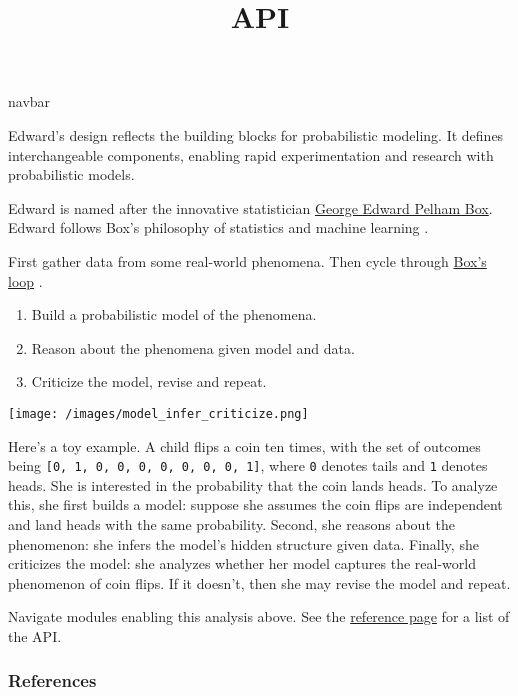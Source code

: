 \title{API}

{{navbar}}

Edward's design reflects the building blocks for probabilistic
modeling. It defines interchangeable components, enabling rapid
experimentation and research with probabilistic models.

Edward is named after the innovative statistician
\href{https://en.wikipedia.org/wiki/George_E._P._Box}{George Edward
Pelham Box}. Edward follows Box's philosophy of statistics and machine
learning \citep{box1976science}.

First gather data from some real-world phenomena. Then cycle through
\href{http://www.annualreviews.org/eprint/7xbyci3nwAg5kEttvvjk/full/10.1146/annurev-statistics-022513-115657}
{Box's loop} \citep{blei2014build}.

\begin{enumerate}
\item Build a probabilistic model of the phenomena.
\item Reason about the phenomena given model and data.
\item Criticize the model, revise and repeat.
\end{enumerate}

\texttt{[image: /images/model\_infer\_criticize.png]}

Here's a toy example. A child flips a coin ten times, with the set of outcomes
being \texttt{{[}0,\ 1,\ 0,\ 0,\ 0,\ 0,\ 0,\ 0,\ 0,\ 1{]}}, where \texttt{0}
denotes tails and \texttt{1} denotes heads. She is interested in the
probability that the coin lands heads. To analyze this, she first
builds a model: suppose she assumes the coin flips are independent and
land heads with the same probability. Second, she reasons about the
phenomenon: she infers the model's hidden structure given data.
Finally, she criticizes the model: she analyzes whether her model
captures the real-world phenomenon of coin flips. If it doesn't, then
she may revise the model and repeat.

Navigate modules enabling this analysis above.
See the
\href{/api/reference}{reference page} for a list of the API.

\subsubsection{References}\label{references}
